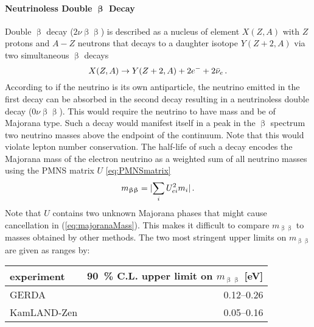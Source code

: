     \paragraph{Neutrinoless Double $\boldsymbol{\upbeta}$ Decay}
    Double $\upbeta$ decay ($2\nu\upbeta\upbeta$) is described as a nucleus of element $X(Z,A)$ with $Z$ protons and $A-Z$ neutrons that decays to a daughter isotope $Y(Z+2,A)$ via two simultaneous $\upbeta$ decays 
    \begin{equation}
        X(Z,A) \rightarrow Y(Z+2,A) + 2e^- + 2\bar{\nu}_e \text{\,.}
    \end{equation}
    According to \cite{zuber2011neutrino} if the neutrino is its own antiparticle, the neutrino emitted in the first decay can be absorbed in the second decay resulting in a neutrinoless double decay ($0\nu\upbeta\upbeta$). This would require the neutrino to have mass and be of Majorana type. Such a decay would manifest itself in a peak in the $\upbeta$ spectrum two neutrino masses above the endpoint of the continuum. Note that this would violate lepton number conservation. The half-life of such a decay encodes the Majorana mass of the electron neutrino as a weighted sum of all neutrino masses using the PMNS matrix $U$ \eqref{eq:PMNSmatrix}
    \begin{equation}
        \label{eq:majoranaMass}
        m_{\upbeta\upbeta} = \lvert\sum_i U_{ei}^2 m_i\rvert \text{\,.}
    \end{equation}
    Note that $U$ contains two unknown Majorana phases that might cause cancellation in (\ref{eq:majoranaMass}). This makes it difficult to compare $m_{\upbeta\upbeta}$ to masses obtained by other methods. The two most stringent upper limits on $m_{\upbeta\upbeta}$ are given as ranges by:
    \begin{center}
    \begin{tabular}{lr}
        \toprule
        experiment & \SI{90}{\percent} C.L. upper limit on $m_{\upbeta\upbeta}$ [eV]\\
        \hline
        GERDA \cite{Agostini2018} &  0.12–0.26 \\
        KamLAND-Zen \cite{Gando2016} & 0.05–0.16 \\
        \bottomrule
    \end{tabular}
    \end{center}
    
